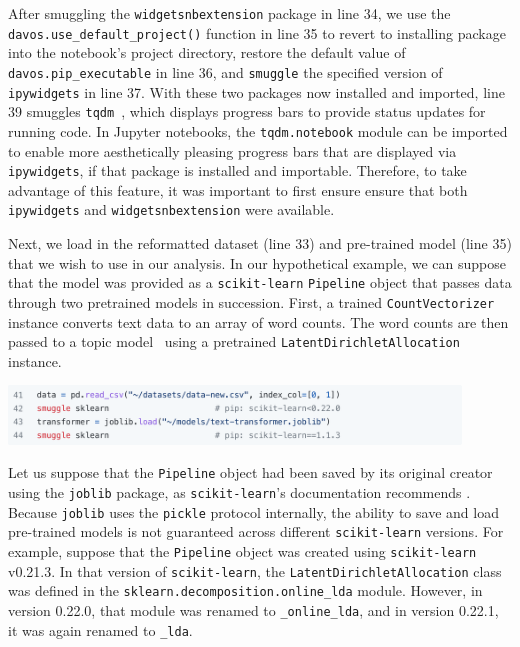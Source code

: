 \documentclass[preprint,12pt,a4paper]{elsarticle}
\begin{document}
After smuggling the \texttt{widgetsnbextension} package in line 34, we use the \texttt{davos.use\_default\_project()} function in line 35 to revert to installing package into the notebook's project directory, restore the default value of \texttt{davos.pip\_executable} in line 36, and \texttt{smuggle} the specified version of \texttt{ipywidgets} in line 37.
With these two packages now installed
and imported, line 39 smuggles \texttt{tqdm}~\cite{daCoEtal22}, which
displays progress bars to provide status updates for running code. In
Jupyter notebooks, the \texttt{tqdm.notebook} module can be imported
to enable more aesthetically pleasing progress bars that are displayed via
\texttt{ipywidgets}, if that package is installed and
importable. Therefore, to take advantage of this feature, it was
important to first ensure ensure that both \texttt{ipywidgets} and \texttt{widgetsnbextension} were available.

Next, we load in the reformatted dataset (line 33) and pre-trained
model (line 35) that we wish to use in our analysis.  In our
hypothetical example, we can suppose that the model was provided as a
\texttt{scikit-learn} \texttt{Pipeline} object that passes data
through two pretrained models in succession.  First, a trained \texttt{CountVectorizer}
instance converts text data to an array of word counts.  The
word counts are then passed to a topic model~\cite{BleiEtal03} using a
pretrained \texttt{LatentDirichletAllocation} instance.
\begin{center}
\includegraphics[width=0.9\textwidth]{figs/example8}
\end{center}
Let us suppose that the \texttt{Pipeline} object had been saved by its
original creator using the \texttt{joblib} package, as
\texttt{scikit-learn}'s documentation recommends \cite{skle22}.  Because
\texttt{joblib} uses the \texttt{pickle} protocol internally, the
ability to save and load pre-trained models is not guaranteed across
different \texttt{scikit-learn} versions.  For example, suppose that
the \texttt{Pipeline} object was created using \texttt{scikit-learn}
v0.21.3.  In that version of \texttt{scikit-learn}, the
\texttt{LatentDirichletAllocation} class was defined in
the \texttt{sklearn.decomposition.online\_lda} module.  However, in version
0.22.0, that module was renamed to \texttt{\_online\_lda}, and in
version 0.22.1, it was again renamed to \texttt{\_lda}.
\end{document}
